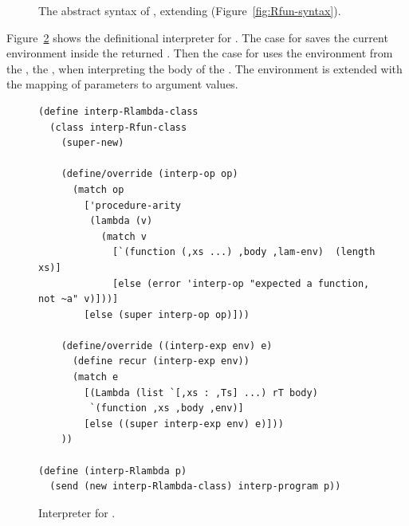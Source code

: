 \documentclass[11pt]{book}
\newcommand{\gray}[1]{{\color{gray} #1}}
\begin{document}
\begin{figure}[tp]
\centering
\fbox{
  \begin{minipage}{0.96\textwidth}
    \small
\[
\begin{array}{lcl}
  \itm{op} &::=& \ldots \mid \code{procedure-arity} \\
  \Exp &::=& \gray{ \INT{\Int} \VAR{\Var} \mid \LET{\Var}{\Exp}{\Exp} } \\
       &\mid& \gray{ \PRIM{\itm{op}}{\Exp\ldots} }\\
     &\mid& \gray{ \BOOL{\itm{bool}}
      \mid \IF{\Exp}{\Exp}{\Exp} } \\
     &\mid& \gray{ \VOID{} \mid \LP\key{HasType}~\Exp~\Type \RP 
     \mid \APPLY{\Exp}{\Exp\ldots} }\\
     &\mid& \LAMBDA{\LP\LS\Var\code{:}\Type\RS\ldots\RP}{\Type}{\Exp}\\
 \Def &::=& \gray{ \FUNDEF{\Var}{\LP\LS\Var \code{:} \Type\RS\ldots\RP}{\Type}{\code{'()}}{\Exp} }\\
  \LangLam{} &::=& \gray{ \PROGRAMDEFSEXP{\code{'()}}{\LP\Def\ldots\RP}{\Exp} }
\end{array}
\]
\end{minipage}
}
\caption{The abstract syntax of \LangLam{}, extending \LangFun{} (Figure~\ref{fig:Rfun-syntax}).}
\label{fig:Rlam-syntax}
\end{figure}

\label{sec:interp-Rlambda}

Figure~\ref{fig:interp-Rlambda} shows the definitional interpreter for
\LangLam{}. The case for  saves the current environment
inside the returned . Then the case for  uses
the environment from the , the , when
interpreting the body of the .  The 
environment is extended with the mapping of parameters to argument
values.

\begin{figure}[tbp]
\begin{lstlisting}
(define interp-Rlambda-class
  (class interp-Rfun-class
    (super-new)

    (define/override (interp-op op)
      (match op
        ['procedure-arity
         (lambda (v)
           (match v
             [`(function (,xs ...) ,body ,lam-env)  (length xs)]
             [else (error 'interp-op "expected a function, not ~a" v)]))]
        [else (super interp-op op)]))

    (define/override ((interp-exp env) e)
      (define recur (interp-exp env))
      (match e
        [(Lambda (list `[,xs : ,Ts] ...) rT body)
         `(function ,xs ,body ,env)]
        [else ((super interp-exp env) e)]))
    ))

(define (interp-Rlambda p)
  (send (new interp-Rlambda-class) interp-program p))
\end{lstlisting}
\caption{Interpreter for \LangLam{}.}
\label{fig:interp-Rlambda}
\end{figure}
\end{document}
